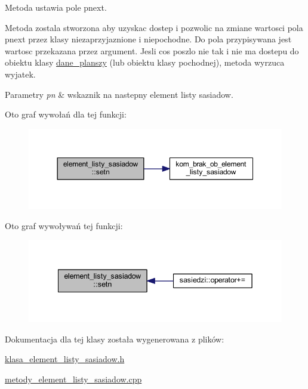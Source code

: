Metoda ustawia pole pnext.

Metoda zostala stworzona aby uzyskac dostep i pozwolic na zmiane wartosci pola pnext przez klasy niezaprzyjaznione i niepochodne. Do pola przypisywana jest wartosc przekazana przez argument. Jesli cos poszlo nie tak i nie ma dostepu do obiektu klasy \mbox{\hyperlink{classdane__planszy}{dane\+\_\+planszy}} (lub obiektu klasy pochodnej), metoda wyrzuca wyjatek. 
\begin{DoxyParams}{Parametry}
{\em pn} & wskaznik na nastepny element listy sasiadow. \\
\hline
\end{DoxyParams}
Oto graf wywołań dla tej funkcji\+:
\nopagebreak
\begin{figure}[H]
\begin{center}
\leavevmode
\includegraphics[width=350pt]{classelement__listy__sasiadow_a13c6144a9053a0c8ba1aac2a3ca8a575_cgraph}
\end{center}
\end{figure}
Oto graf wywoływań tej funkcji\+:
\nopagebreak
\begin{figure}[H]
\begin{center}
\leavevmode
\includegraphics[width=342pt]{classelement__listy__sasiadow_a13c6144a9053a0c8ba1aac2a3ca8a575_icgraph}
\end{center}
\end{figure}


Dokumentacja dla tej klasy została wygenerowana z plików\+:\begin{DoxyCompactItemize}
\item 
\mbox{\hyperlink{klasa__element__listy__sasiadow_8h}{klasa\+\_\+element\+\_\+listy\+\_\+sasiadow.\+h}}\item 
\mbox{\hyperlink{metody__element__listy__sasiadow_8cpp}{metody\+\_\+element\+\_\+listy\+\_\+sasiadow.\+cpp}}\end{DoxyCompactItemize}
